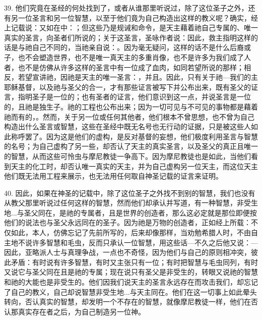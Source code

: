 39. 他们究竟在圣经的何处找到了，或者从谁那里听说过，除了这位圣子之外，还有另一位圣言和另一位智慧，以至于他们竟为自己构造出这样的教义呢？确实，经上记载说：又如在中：；但这些乃是规诫和命令，是天主藉着祂自己专属的、唯一真实的圣言，向圣者们所说的；关于这圣言，圣咏作者说：因此，救主指明这样的话是与祂自己不同的，当祂亲自说：。因为毫无疑问，这样的话不是什么后裔或子，也不会塑造世界，也不是唯一真天主的多重肖像，也不是许多为我们成了人者，也不是仿佛从许多这样的圣言中有一位成了血肉，如同若望所说的那样；相反，若望宣讲祂，因祂是天主的唯一圣言：，并且。因此，只有关于祂---我们的主耶稣基督，以及祂与圣父的合一，才有那些证言被写下并公布出来，既有圣父的证言，指明圣子是一位的；也有圣者的证言，他们意识到这一点，并说圣言是一位的，且祂是独生子。祂的工程也公布出来；因为一切可见与不可见的事物都是藉着祂而有的，。然而，关于另一位或任何其他者，他们根本不曾思想，也不曾为自己构造出什么圣言或智慧，这些在圣经中既无名号也无行动的证据，只是被这些人如此称呼罢了。因为这是他们的虚构，是反对基督的妄想，他们极度利用圣言与智慧的名号；为自己虚构了另一些，却否认了天主的真实圣言，以及圣父的真正且唯一的智慧，从而这些可怜虫与摩尼教徒一争高下。因为摩尼教徒也是如此，当他们看到天主的化工时，却否认唯一真实的天主，并为自己虚构另一位天主，而这位天主他们既无法用工程来展示，也无法用任何取自神圣记载的证言来证明。\par

40. 因此，如果在神圣的记载中，除了这位圣子之外找不到别的智慧，我们也没有从教父那里听说过任何这样的智慧，然而他们却承认并写道，有一种智慧，非受生地...与圣父同在，是祂的专属者，且是世界的创造者，那么这必定就是那位即便按他们的说法也与圣父永远同在的圣子。因为祂是万物的创造者，正如经上所载：不仅如此，本人，仿佛忘记了先前所写的，后来却像那样，当劝勉希腊人时，不由自主地不说许多智慧和毛虫，反而只承认一位智慧，用这些话---不久之后他又说：---因此，亚略派人士与真理争战，一点也不奇怪，因为他们与自己的原则相冲突，彼此矛盾：有时说有许多智慧，有时又主张只有一位；有时把智慧与毛虫同列，有时又说它与圣父同在且是祂的专属；现在说只有圣父是非受生的，转眼又说祂的智慧和祂的大能也是非受生的。他们因我们说天主的圣言永远存在而攻击我们，却忘记了自己的教义，自己却说智慧非受生地...与天主同在。他们在这一切事上如此晕头转向，否认真实的智慧，却发明一个不存在的智慧，就像摩尼教徒一样，他们在否认那真实存在者之后，为自己制造另一位神。\par

